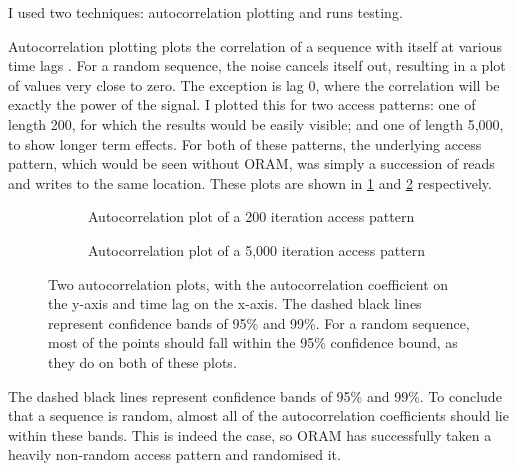 \documentclass[12pt,a4paper,twoside,openright]{report}
\begin{document}
I used two techniques: autocorrelation plotting and runs testing.

Autocorrelation plotting plots the correlation of a sequence with itself at various time lags \cite{nistautocorr}. For a random sequence, the noise cancels itself out, resulting in a plot of values very close to zero. The exception is lag 0, where the correlation will be exactly the power of the signal. I plotted this for two access patterns: one of length 200, for which the results would be easily visible; and one of length 5,000, to show longer term effects. For both of these patterns, the underlying access pattern, which would be seen without ORAM, was simply a succession of reads and writes to the same location. These plots are shown in \cref{fig:shortAutocorr} and \cref{fig:longAutocorr} respectively.

\begin{figure}
    \centering
    \begin{subfigure}{\textwidth}
        \centering
        
        \caption{Autocorrelation plot of a 200 iteration access pattern}
        \label{fig:shortAutocorr}
    \end{subfigure}
    \begin{subfigure}{\textwidth}
        \centering
        
        \caption{Autocorrelation plot of a 5,000 iteration access pattern}
        \label{fig:longAutocorr}
    \end{subfigure}
    \caption{Two autocorrelation plots, with the autocorrelation coefficient on the y-axis and time lag on the x-axis. The dashed black lines represent confidence bands of 95\% and 99\%. For a random sequence, most of the points should fall within the 95\% confidence bound, as they do on both of these plots.}
    \label{fig:autocorr}
\end{figure}

The dashed black lines represent confidence bands of 95\% and 99\%. To conclude that a sequence is random, almost all of the autocorrelation coefficients should lie within these bands. This is indeed the case, so ORAM has successfully taken a heavily non-random access pattern and randomised it.
\end{document}
